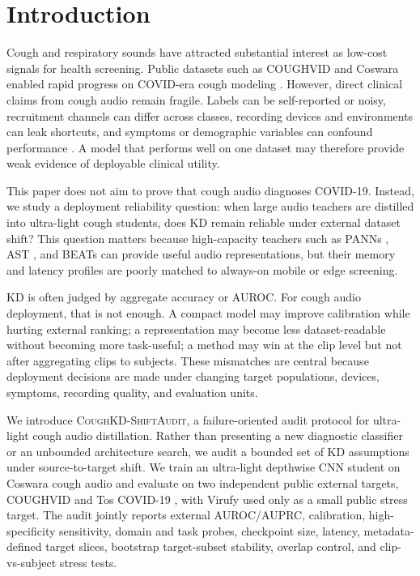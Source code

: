 \section{Introduction}

Cough and respiratory sounds have attracted substantial interest as low-cost signals for health screening. Public datasets such as COUGHVID and Coswara enabled rapid progress on COVID-era cough modeling \cite{orlandic2021coughvid,bhattacharya2023coswara}. However, direct clinical claims from cough audio remain fragile. Labels can be self-reported or noisy, recruitment channels can differ across classes, recording devices and environments can leak shortcuts, and symptoms or demographic variables can confound performance \cite{han2022sounds}. A model that performs well on one dataset may therefore provide weak evidence of deployable clinical utility.

This paper does not aim to prove that cough audio diagnoses COVID-19. Instead, we study a deployment reliability question: when large audio teachers are distilled into ultra-light cough students, does KD remain reliable under external dataset shift? This question matters because high-capacity teachers such as PANNs \cite{kong2020panns}, AST \cite{gong2021ast}, and BEATs \cite{chen2023beats} can provide useful audio representations, but their memory and latency profiles are poorly matched to always-on mobile or edge screening.

KD is often judged by aggregate accuracy or AUROC. For cough audio deployment, that is not enough. A compact model may improve calibration while hurting external ranking; a representation may become less dataset-readable without becoming more task-useful; a method may win at the clip level but not after aggregating clips to subjects. These mismatches are central because deployment decisions are made under changing target populations, devices, symptoms, recording quality, and evaluation units.

We introduce \textsc{CoughKD-ShiftAudit}, a failure-oriented audit protocol for ultra-light cough audio distillation. Rather than presenting a new diagnostic classifier or an unbounded architecture search, we audit a bounded set of KD assumptions under source-to-target shift. We train an ultra-light depthwise CNN student on Coswara cough audio and evaluate on two independent public external targets, COUGHVID and Tos COVID-19 \cite{buenosaires2021toscovid}, with Virufy used only as a small public stress target. The audit jointly reports external AUROC/AUPRC, calibration, high-specificity sensitivity, domain and task probes, checkpoint size, latency, metadata-defined target slices, bootstrap target-subset stability, overlap control, and clip-vs-subject stress tests.

